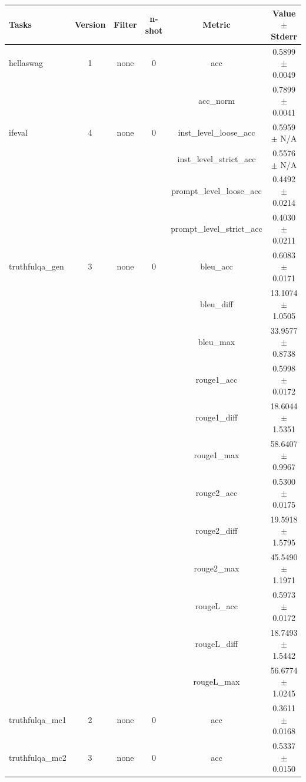 \documentclass{ifacconf}
\begin{document}
	\vfill
	\clearpage
	\pagebreak
	
	\begin{strip}
		\begin{minipage}{\textwidth}
			\begin{table}[H]
				\centering
				\begin{tabular}{|l|c|c|c|c|c|}
					\hline
					\textbf{Tasks} & \textbf{Version} & \textbf{Filter} & \textbf{n-shot} & \textbf{Metric} & \textbf{Value} $\pm$ \textbf{Stderr} \\ \hline
					hellaswag & 1 & none & 0 & acc & 0.5899 $\pm$ 0.0049 \\ \hline
					& & & & acc\_norm & 0.7899 $\pm$ 0.0041 \\ \hline
					ifeval & 4 & none & 0 & inst\_level\_loose\_acc & 0.5959 $\pm$ N/A \\ \hline
					& & & & inst\_level\_strict\_acc & 0.5576 $\pm$ N/A \\ \hline
					& & & & prompt\_level\_loose\_acc & 0.4492 $\pm$ 0.0214 \\ \hline
					& & & & prompt\_level\_strict\_acc & 0.4030 $\pm$ 0.0211 \\ \hline
					truthfulqa\_gen & 3 & none & 0 & bleu\_acc & 0.6083 $\pm$ 0.0171 \\ \hline
					& & & & bleu\_diff & 13.1074 $\pm$ 1.0505 \\ \hline
					& & & & bleu\_max & 33.9577 $\pm$ 0.8738 \\ \hline
					& & & & rouge1\_acc & 0.5998 $\pm$ 0.0172 \\ \hline
					& & & & rouge1\_diff & 18.6044 $\pm$ 1.5351 \\ \hline
					& & & & rouge1\_max & 58.6407 $\pm$ 0.9967 \\ \hline
					& & & & rouge2\_acc & 0.5300 $\pm$ 0.0175 \\ \hline
					& & & & rouge2\_diff & 19.5918 $\pm$ 1.5795 \\ \hline
					& & & & rouge2\_max & 45.5490 $\pm$ 1.1971 \\ \hline
					& & & & rougeL\_acc & 0.5973 $\pm$ 0.0172 \\ \hline
					& & & & rougeL\_diff & 18.7493 $\pm$ 1.5442 \\ \hline
					& & & & rougeL\_max & 56.6774 $\pm$ 1.0245 \\ \hline
					truthfulqa\_mc1 & 2 & none & 0 & acc & 0.3611 $\pm$ 0.0168 \\ \hline
					truthfulqa\_mc2 & 3 & none & 0 & acc & 0.5337 $\pm$ 0.0150 \\ \hline
				\end{tabular}
				\label{tab:llama31_q5km}
			\end{table}
			

\end{minipage}
\end{strip}
\end{document}
